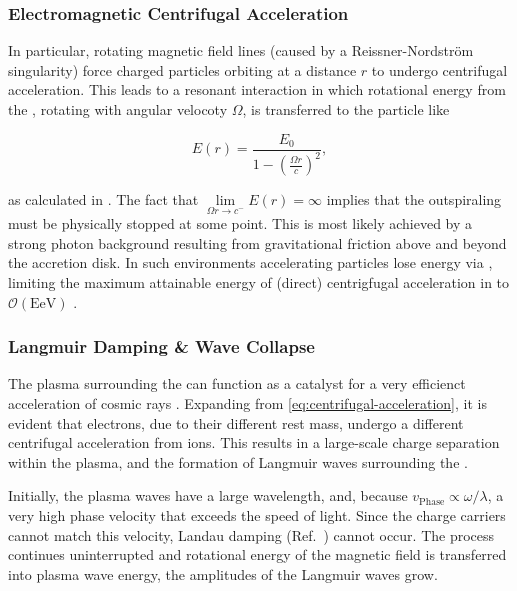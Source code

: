 \subsubsection{Electromagnetic Centrifugal Acceleration}
\label{sssec:centrifugal-acceleration}

In particular, rotating magnetic field lines (caused by a Reissner-Nordström 
singularity) force charged particles orbiting at a distance $r$ to
undergo centrifugal acceleration. This leads to a resonant interaction in which
rotational energy from the \SMBH, rotating with angular velocoty $\Omega$, is 
transferred to the particle like 

\begin{equation}
	\label{eq:centrifugal-acceleration}
	E(r) = \frac{E_0}{1-\left(\frac{\Omega r}{c}\right)^2},
\end{equation}

as calculated in \cite{riegerParticleAccelerationRotating1999}. The fact that 
$\lim\limits_{\Omega r\to c^-} E(r) = \infty$ implies that the outspiraling 
must be physically stopped at some point. This is most likely achieved by a 
strong photon background resulting from gravitational friction above and beyond
the accretion disk. In such environments accelerating particles lose energy via
\ICS, limiting the maximum attainable energy of (direct) centrigfugal 
acceleration in \AGNs to $\mathcal{O}(\unit{\exa\eV})$ 
\cite{osmanovEfficiencyParticleAcceleration2007}.

\subsubsection{Langmuir Damping \& Wave Collapse}

The plasma surrounding the \AGN can function as a catalyst for a very 
efficienct acceleration of cosmic rays 
\cite{osmanovExtremelyEfficientZevatron2014}. Expanding from 
\cref{eq:centrifugal-acceleration}, it is evident that electrons, due to their
different rest mass, undergo a different centrifugal acceleration from ions. 
This results in a large-scale charge separation within the plasma, and the 
formation of Langmuir waves surrounding the \SMBH. 

Initially, the plasma waves have a large wavelength, and, because 
$v_\mathrm{Phase} \propto \omega/\lambda$, a very high phase velocity that
exceeds the speed of light. Since the charge carriers cannot match this 
velocity, Landau damping (Ref.\ \cite{landau61VibrationsElectronic1965}) 
cannot occur. The process continues uninterrupted and rotational energy of the 
magnetic field is transferred into plasma wave energy, the amplitudes of the 
Langmuir waves grow.

